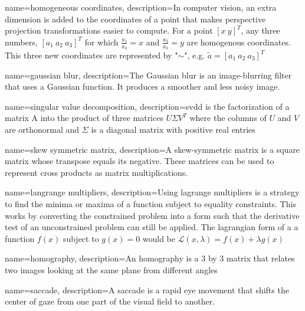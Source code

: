 
{	
	name={homogeneous coordinates}, 
	description={In computer vision, an extra dimension is added to the coordinates of a point that makes perspective projection transformations easier to compute. For a point $[x \ y]^T$, any three numbers, $[a_1 \ a_2 \ a_3]^T$ for which $\frac{a_1}{a_3} = x$ and $\frac{a_2}{a_3} = y$ are homogenous coordinates. This three new coordinates are represented by "$\sim$", e.g. $\widetilde{a} = [a_1 \ a_2 \ a_3]^T$}
}

{	
	name={gaussian blur}, 
	description={The Gaussian blur is an image-blurring filter that uses a Gaussian function. It produces a smoother and less noisy image.}
}

{
	name={singular value decomposition},
	description={\acrfull{svdd} is  the  factorization  of a matrix A into  the product of three matrices $U$$\Sigma$$V^T$   where the columns of $U$ and $V$ are orthonormal and $\Sigma$ is a diagonal matrix with positive real entries}
}

{
	name={skew symmetric matrix},
	description={A skew-symmetric matrix is a square matrix whose transpose equals its negative. These matrices can be used to represent cross products as matrix multiplications.}
}

{
	name={langrange multipliers},
	description={Using lagrange multipliers is a strategy to find the minima or maxima of a function subject to equality constraints. This works by converting the constrained problem into a form such that the derivative test of an unconstrained problem can still be applied. The lagrangian form of a a function $f(x)$ subject to $g(x) = 0$ would be $\mathcal{L}(x, \lambda)=f(x)+\lambda g(x)$}
}

{
	name={homography},
	description={An homography is a 3 by 3 matrix that relates two images looking at the same plane from different angles}
}

{
	name={saccade},
	description={A saccade is a rapid eye movement that shifts the center of gaze from one part of the visual field to another.}
}
